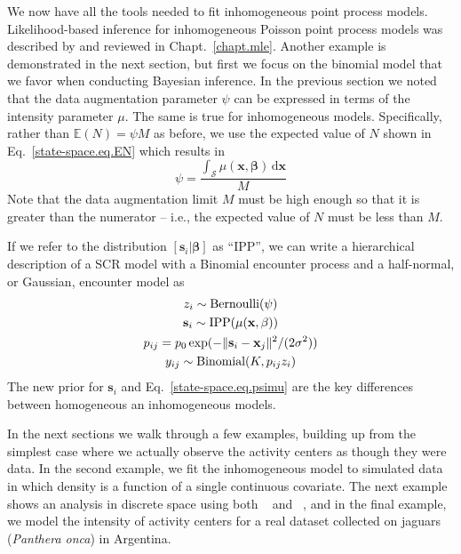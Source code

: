 We now have all the tools needed to fit inhomogeneous point process
models. Likelihood-based inference for inhomogeneous Poisson point
process models was described by \citet{borchers_efford:2008} and
reviewed in Chapt.~\ref{chapt.mle}. Another example is demonstrated in
the next section, but first we focus on the binomial
model that we favor when conducting Bayesian inference. In the
previous section we noted that the data augmentation parameter $\psi$
can be expressed in terms of the intensity parameter $\mu$. The same
is true for inhomogeneous models. Specifically, rather than
$\mathbb{E}(N) = \psi M$ as before, we use the expected value of $N$ shown
in Eq.~\ref{state-space.eq.EN} which results in
\begin{equation}
\psi = \frac{\int_{\mathcal{S}} \mu(\mathbf{x},
  \bm{\beta}) \, \mathrm{d}\mathbf{x}}{M}
\label{state-space.eq.psimu}
\end{equation}
Note that the data augmentation limit $M$ must be high enough so that
it is greater than the numerator -- i.e., the expected value
of $N$ must be less than $M$.

If we refer to the distribution $[\mathbf{s}_i | \bm{\beta}]$ as
``IPP'', we can write a hierarchical description of a SCR model with a
Binomial encounter process and a half-normal, or Gaussian, encounter model as
\begin{gather*}
z_i \sim \mbox{Bernoulli}(\psi) \\
{\bf s}_i \sim \mbox{IPP}(\mu(\mathbf{x},\beta)) \\
p_{ij} = p_0 \exp(-\|{\bf s}_i - {\bf x}_{j}\|^2/(2\sigma^2)) \\
y_{ij} \sim \mbox{Binomial}(K, p_{ij} z_i)
\end{gather*}
The new prior for $\mathbf{s}_i$ and Eq.~\ref{state-space.eq.psimu}
are the key differences between homogeneous an inhomogeneous
models.

In the next sections we walk through a few examples, building up from
the simplest case where we actually observe the activity centers as
though they were data. In the second example, we fit the inhomogeneous model to simulated
data in which density is a function of a single continuous
covariate.
The next example shows an analysis in discrete space using
both \secr~\citep{efford:2011} and \jags~\citep{plummer:2003}, and in the
final example, we model the intensity of
activity centers for a real dataset collected on jaguars
(\emph{Panthera onca}) in Argentina.

